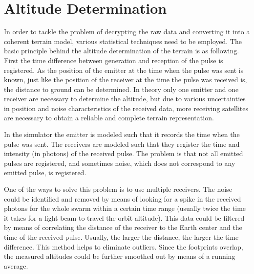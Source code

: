 \section{Altitude Determination}
\label{altDet}
In order to tackle the problem of decrypting the raw data and converting it into a coherent terrain model, various statistical techniques need to be employed. The basic principle behind the altitude determination of the terrain is as following. First the time difference between generation and reception of the pulse is registered. As the position of the emitter at the time when the pulse was sent is known, just like the position of the receiver at the time the pulse was received is, the distance to ground can be determined. In theory only one emitter and one receiver are necessary to determine the altitude, but due to various uncertainties in position and noise characteristics of the received data, more receiving satellites are necessary to obtain a reliable and complete terrain representation. 

In the simulator the emitter is modeled such that it records the time when the pulse was sent. The receivers are modeled such that they register the time and intensity (in photons) of the received pulse. The problem is that not all emitted pulses are registered, and sometimes noise, which does not correspond to any emitted pulse, is registered.

One of the ways to solve this problem is to use multiple receivers. The noise could be identified and removed by means of looking for a spike in the received photons for the whole swarm within a certain time range (usually twice the time it takes for a light beam to travel the orbit altitude). This data could be filtered by means of correlating the distance of the receiver to the Earth center and the time of the received pulse. Usually, the larger the distance, the larger the time difference. This method helps to eliminate outliers.
Since the footprints overlap, the measured altitudes could be further smoothed out by means of a running average. 
